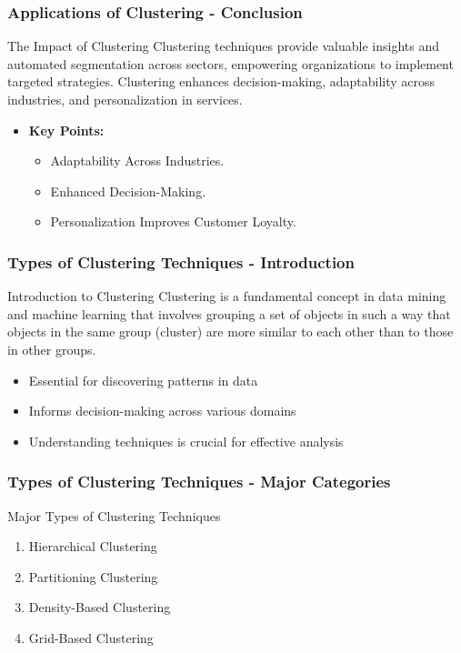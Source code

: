 \documentclass[aspectratio=169]{beamer}
\begin{document}
\begin{frame}[fragile]
    \frametitle{Applications of Clustering - Conclusion}
    \begin{block}{The Impact of Clustering}
        Clustering techniques provide valuable insights and automated segmentation across sectors, empowering organizations to implement targeted strategies. Clustering enhances decision-making, adaptability across industries, and personalization in services.
    \end{block}
    \begin{itemize}
        \item \textbf{Key Points:}
            \begin{itemize}
                \item Adaptability Across Industries.
                \item Enhanced Decision-Making.
                \item Personalization Improves Customer Loyalty.
            \end{itemize}
    \end{itemize}
\end{frame}

\begin{frame}[fragile]
    \frametitle{Types of Clustering Techniques - Introduction}
    \begin{block}{Introduction to Clustering}
        Clustering is a fundamental concept in data mining and machine learning that involves grouping a set of objects in such a way that objects in the same group (cluster) are more similar to each other than to those in other groups. 
    \end{block}
    
    \begin{itemize}
        \item Essential for discovering patterns in data
        \item Informs decision-making across various domains
        \item Understanding techniques is crucial for effective analysis
    \end{itemize}
\end{frame}

\begin{frame}[fragile]
    \frametitle{Types of Clustering Techniques - Major Categories}
    \begin{block}{Major Types of Clustering Techniques}
        \begin{enumerate}
            \item Hierarchical Clustering
            \item Partitioning Clustering
            \item Density-Based Clustering
            \item Grid-Based Clustering
        \end{enumerate}
    \end{block}
\end{frame}
\end{document}
